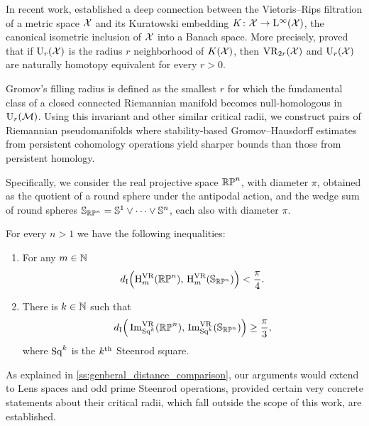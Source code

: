 \medskip In recent work, \cite{lim2024vietoris} established a deep connection between the Vietoris--Rips filtration of a metric space \(\mathcal{X}\) and its Kuratowski embedding \(K \colon \mathcal{X} \to \mathrm{L}^\infty(\mathcal{X})\), the canonical isometric inclusion of \(\mathcal{X}\) into a Banach space.
More precisely, \cite{lim2024vietoris} proved that if \(\mathrm{U}_r(\mathcal{X})\) is the radius \(r\) neighborhood of \(K(\mathcal{X})\), then \(\mathrm{VR}_{2r}(\mathcal{X})\) and \(\mathrm{U}_r(\mathcal{X})\) are naturally homotopy equivalent for every \(r > 0\).

Gromov's filling radius is defined as the smallest \(r\) for which the fundamental class of a closed connected Riemannian manifold becomes null-homologous in \(\mathrm{U}_r(\mathcal{M})\).
Using this invariant and other similar critical radii, we construct pairs of Riemannian pseudomanifolds where stability-based Gromov--Hausdorff estimates from persistent cohomology operations yield sharper bounds than those from persistent homology.

Specifically, we consider the real projective space \(\mathbb{RP}^n\), with diameter \(\pi\), obtained as the quotient of a round sphere under the antipodal action, and the wedge sum of round spheres \(\mathbb{S}_{\mathbb{RP}^n} = \mathbb{S}^1 \vee \dots \vee \mathbb{S}^n\), each also with diameter \(\pi\).

\theorem
For every \(n > 1\) we have the following inequalities:
\begin{enumerate}
	\item For any \(m \in \mathbb{N}\)
	\[
	d_{\mathrm{I}}\Big(\mathrm{H}^{\mathrm{VR}}_m(\mathbb{RP}^n),\, \mathrm{H}^{\mathrm{VR}}_m(\mathbb{S}_{\mathbb{RP}^n})\Big) < \frac{\pi}{4}.
	\]
	\item There is \(k \in \mathbb{N}\) such that
	\[
	d_{\mathrm{I}}\Big(\operatorname{Im}_{\mathrm{Sq}^k}^{\mathrm{VR}}(\mathbb{RP}^n),\, \operatorname{Im}_{\mathrm{Sq}^k}^{\mathrm{VR}}(\mathbb{S}_{\mathbb{RP}^n})\Big) \geq \frac{\pi}{3},
	\]
	where \(\mathrm{Sq}^k\) is the \(k^{\mathrm{th}}\) Steenrod square.
\end{enumerate}

\medskip As explained in \cref{ss:genberal_distance_comparison}, our arguments would extend to Lens spaces and odd prime Steenrod operations, provided certain very concrete statements about their critical radii, which fall outside the scope of this work, are established.